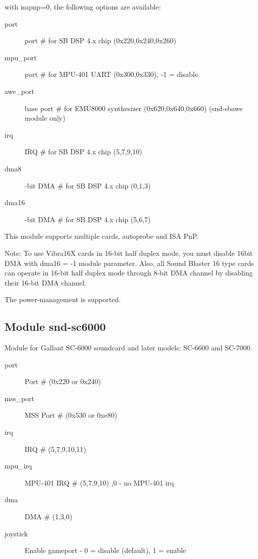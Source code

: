 \documentclass[a4paper,8pt,english]{sphinxmanual}
\begin{document}
with isapnp=0, the following options are available:
\begin{description}
\item[{port}] \leavevmode
port \# for SB DSP 4.x chip (0x220,0x240,0x260)

\item[{mpu\_port}] \leavevmode
port \# for MPU-401 UART (0x300,0x330), -1 = disable

\item[{awe\_port}] \leavevmode
base port \# for EMU8000 synthesizer (0x620,0x640,0x660) (snd-sbawe
module only)

\item[{irq}] \leavevmode
IRQ \# for SB DSP 4.x chip (5,7,9,10)

\item[{dma8}] -bit DMA \# for SB DSP 4.x chip (0,1,3)

\item[{dma16}] -bit DMA \# for SB DSP 4.x chip (5,6,7)

\end{description}

This module supports multiple cards, autoprobe and ISA PnP.

Note: To use Vibra16X cards in 16-bit half duplex mode, you must
disable 16bit DMA with dma16 = -1 module parameter.
Also, all Sound Blaster 16 type cards can operate in 16-bit
half duplex mode through 8-bit DMA channel by disabling their
16-bit DMA channel.

The power-management is supported.


\subsection{Module snd-sc6000}
\label{sound/alsa-configuration:module-snd-sc6000}
Module for Gallant SC-6000 soundcard and later models: SC-6600 and
SC-7000.
\begin{description}
\item[{port}] \leavevmode
Port \# (0x220 or 0x240)

\item[{mss\_port}] \leavevmode
MSS Port \# (0x530 or 0xe80)

\item[{irq}] \leavevmode
IRQ \# (5,7,9,10,11)

\item[{mpu\_irq}] \leavevmode
MPU-401 IRQ \# (5,7,9,10) ,0 - no MPU-401 irq

\item[{dma}] \leavevmode
DMA \# (1,3,0)

\item[{joystick}] \leavevmode
Enable gameport - 0 = disable (default), 1 = enable

\end{description}
\end{document}
